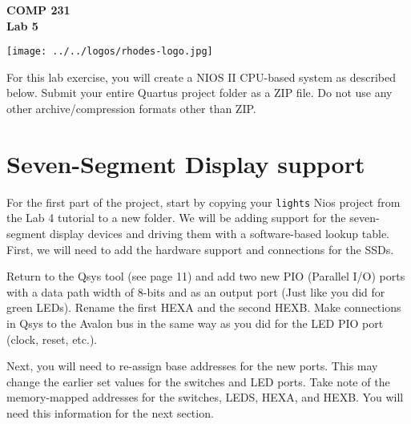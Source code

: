 \documentclass[10pt]{article}
\begin{document}
\hspace{-5mm}
\begin{minipage}{0.65\linewidth}
  \textbf{{\Large COMP 231\\Lab 5}}
\end{minipage}
\begin{minipage}{0.35\linewidth}
  \texttt{[image: ../../logos/rhodes-logo.jpg]}
\end{minipage}

\vspace{.4in}

\noindent For this lab exercise, you will create a NIOS II CPU-based
system as described below. Submit your entire Quartus project folder
as a ZIP file. Do not use any other archive/compression
formats other than ZIP. \\


\section{Seven-Segment Display support}

For the first part of the project, start by copying your {\tt lights} Nios
project from the Lab 4 tutorial to a new folder. We will be adding support for
the seven-segment display devices and driving them with a software-based
lookup table. First, we will need to add the hardware support and connections
for the SSDs.

Return to the Qsys tool (see page 11) and add two new PIO (Parallel I/O) ports with
a data path width of 8-bits and as an output port (Just like you did
for green LEDs). Rename the first HEXA and the second HEXB. Make
connections in Qsys to the Avalon bus in the same way as you did for
the LED PIO port (clock, reset, etc.).

Next, you will need to re-assign base addresses for the new
ports. This may change the earlier set values for the switches and LED
ports. Take note of the memory-mapped addresses for the switches,
LEDS, HEXA, and HEXB.  You will need this information for the next
section.
\end{document}
